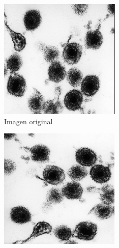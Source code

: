 \documentclass{uc3mpracticas}
\begin{document}
  \begin{figure}[!h]
    \centering
    \begin{subfigure}[b]{0.23\textwidth}
      \includegraphics[width=\textwidth, frame]{Images/og.png}
      \caption{Imagen original}
    \end{subfigure}
    \hfill
    \begin{subfigure}[b]{0.23\textwidth}
      \includegraphics[width=\textwidth, frame]{Images/rot901.png}

\end{subfigure}
\end{figure}
\end{document}
